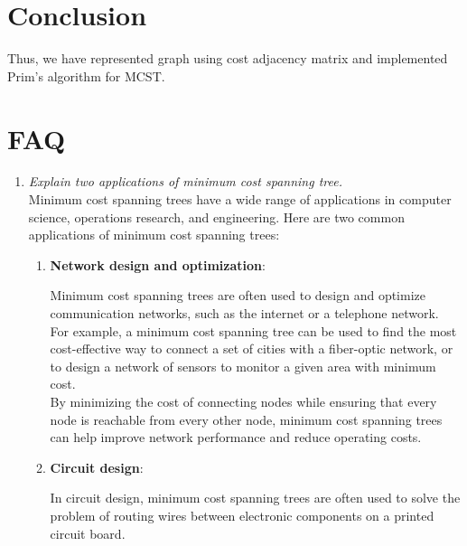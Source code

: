 \documentclass[11pt]{article}
\begin{document}


\section{Conclusion}
Thus, we have represented graph using cost adjacency matrix and implemented Prim's
algorithm for MCST.

\clearpage

\section{FAQ}
\begin{enumerate}
    \item \textit{ Explain two applications of minimum cost spanning tree.}\\
    
          Minimum cost spanning trees have a wide range of applications in computer science, operations research, and engineering. Here are two common applications of minimum cost spanning trees:

          \begin{enumerate}
              \item \textbf{Network design and optimization}:
              
              
              Minimum cost spanning trees are often used to design and optimize communication networks, such as the internet or a telephone network. \\
              
              For example, a minimum cost spanning tree can be used to find the most cost-effective way to connect a set of cities with a fiber-optic network, or to design a network of sensors to monitor a given area with minimum cost. \\
              
              By minimizing the cost of connecting nodes while ensuring that every node is reachable from every other node, minimum cost spanning trees can help improve network performance and reduce operating costs.

              \item \textbf{Circuit design}: 
              
              In circuit design, minimum cost spanning trees are often used to solve the problem of routing wires between electronic components on a printed circuit board.\\
              

\end{enumerate}
\end{enumerate}
\end{document}
